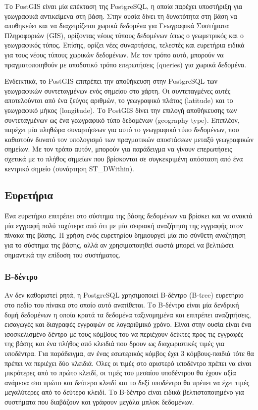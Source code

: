 Το PostGIS είναι μία επέκταση της PostgreSQL, η οποία παρέχει υποστήριξη για γεωγραφικά αντικείμενα στη βάση. Στην ουσία δίνει τη δυνατότητα στη βάση να αποθηκεύει 
και να διαχειρίζεται χωρικά δεδομένα για Γεωγραφικά Συστήματα Πληροφοριών (GIS), ορίζοντας νέους τύπους δεδομένων όπως ο γεωμετρικός και ο γεωγραφικός τύπος. 
Επίσης, ορίζει νέες συναρτήσεις, τελεστές και ευρετήρια ειδικά για τους νέους τύπους χωρικών δεδομένων. Με τον τρόπο αυτό, μπορούν να πραγματοποιηθούν 
με αποδοτικό τρόπο επερωτήσεις (queries) για χωρικά δεδομένα. 

Ενδεικτικά, το PostGIS επιτρέπει την αποθήκευση στην PostgreSQL των γεωγραφικών συντεταγμένων ενός σημείου στο χάρτη. Οι συντεταγμένες αυτές αποτελούνται από ένα 
ζεύγος αριθμών, το γεωγραφικό πλάτος (latitude) και το γεωγραφικό μήκος (longitude). Το PostGIS δίνει την επιλογή αποθήκευσης των συντεταγμένων ως ένα γεωγραφικό 
τύπο δεδομένων (geography type). Επιπλέον, παρέχει μία πληθώρα συναρτήσεων για αυτό το γεωγραφικό τύπο δεδομένων, που καθιστούν δυνατό τον υπολογισμό των πραγματικών 
αποστάσεων μεταξύ γεωγραφικών σημείων. Με τον τρόπο αυτόν, μπορούν για παράδειγμα να γίνουν επερωτήσεις σχετικά με το πλήθος σημείων που βρίσκονται σε συγκεκριμένη 
απόσταση από ένα κεντρικό σημείο (συνάρτηση ST\_DWithin).

\subsection{Ευρετήρια}

Ένα ευρετήριο επιτρέπει στο σύστημα της βάσης δεδομένων να βρίσκει και να ανακτά μία εγγραφή πολύ ταχύτερα από ότι με μία σειριακή αναζήτηση της εγγραφής στον πίνακα 
της βάσης. Η χρήση ενός ευρετηρίου δημιουργεί μία πιο σύνθετη αναζήτηση για το σύστημα της βάσης, αλλά αν χρησιμοποιηθεί σωστά μπορεί να βελτιώσει σημαντικά την επίδοση του 
συστήματος. 

\subsubsection{Β-δέντρο}

Αν δεν καθοριστεί ρητά, η PostgreSQL χρησιμοποιεί B-δέντρο (B-tree) ευρετήριο στο πεδίο του πίνακα στο οποίο αυτό ανατίθεται. Το Β-δέντρο είναι μία δενδρική δομή δεδομένων η οποία 
κρατά τα δεδομένα ταξινομημένα και επιτρέπει αναζητήσεις, εισαγωγές και διαγραφές εγγραφών σε λογαριθμικό χρόνο. Είναι στην ουσία είναι ένα ισοσκελισμένο δέντρο με τους 
κόμβους του να περιέχουν δείκτες προς τις εγγραφές της βάσης και ένα πλήθος από κλειδιά που δρουν ως διαχωριστικές τιμές για υποδέντρα. Για παράδειγμα, αν ένας 
εσωτερικός κόμβος έχει 3 κόμβους-παιδιά τότε θα πρέπει να περιέχει δύο κλειδιά. Όλες οι τιμές στο αριστερό υποδέντρο πρέπει να είναι μικρότερες από το πρώτο κλειδί, 
οι τιμές του μεσαίου υποδέντρου θα έχουν αξία ανάμεσα στο πρώτο και δεύτερο κλειδί και το δεξί υποδέντρο θα πρέπει να έχει τιμές μεγαλύτερες από το δεύτερο κλειδί. 
Το Β-δέντρο είναι ειδικά βελτιστοποιημένο για συστήματα που διαβάζουν και γράφουν μεγάλα μπλοκ δεδομένων.

